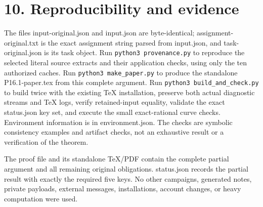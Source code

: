 \documentclass[11pt]{article}
\begin{document}
\section*{10. Reproducibility and evidence}
The files input-original.json and input.json are byte-identical; assignment-original.txt is the exact assignment string parsed from input.json, and task-original.json is its task object. Run \texttt{python3 provenance.py} to reproduce the selected literal source extracts and their application checks, using only the ten authorized caches. Run \texttt{python3 make\_paper.py} to produce the standalone P16.1-paper.tex from this complete argument. Run \texttt{python3 build\_and\_check.py} to build twice with the existing TeX installation, preserve both actual diagnostic streams and TeX logs, verify retained-input equality, validate the exact status.json key set, and execute the small exact-rational curve checks. Environment information is in environment.json. The checks are symbolic consistency examples and artifact checks, not an exhaustive result or a verification of the theorem.

The proof file and its standalone TeX/PDF contain the complete partial argument and all remaining original obligations. status.json records the partial result with exactly the required five keys. No other campaigns, generated notes, private payloads, external messages, installations, account changes, or heavy computation were used.
\end{document}
